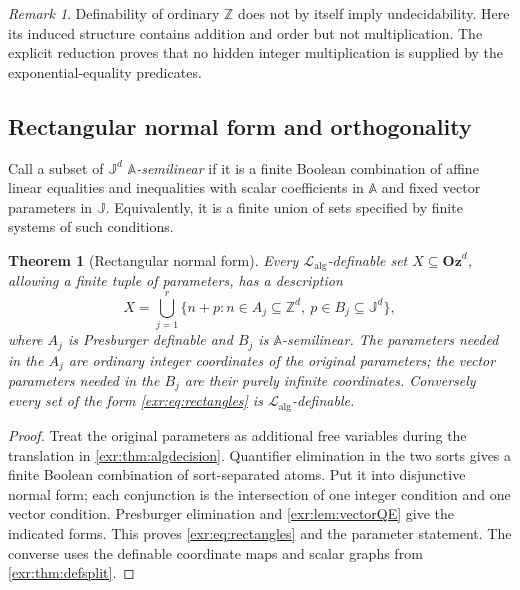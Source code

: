 \documentclass[11pt,letterpaper]{article}
\numberwithin{equation}{section}
\newtheorem{theorem}{Theorem}[section]
\theoremstyle{definition}
\theoremstyle{remark}
\newtheorem{remark}[remark]{Remark}
\newcommand{\Oz}{\mathbf{Oz}}
\newcommand{\Z}{\mathbb Z}
\newcommand{\A}{\mathbb A}
\newcommand{\J}{\mathbb J}
\newcommand{\Lalg}{\mathcal L_{\mathrm{alg}}}
\begin{document}
\begin{remark}
Definability of ordinary $\Z$ does not by itself imply undecidability. Here its
induced structure contains addition and order but not multiplication. The explicit
reduction proves that no hidden integer multiplication is supplied by the
exponential-equality predicates.
\end{remark}

\subsection{Rectangular normal form and orthogonality}
Call a subset of $\J^d$ \emph{$\A$-semilinear} if it is a finite Boolean combination
of affine linear equalities and inequalities with scalar coefficients in $\A$
and fixed vector parameters in $\J$. Equivalently, it is a finite union of sets
specified by finite systems of such conditions.

\begin{theorem}[Rectangular normal form]\label{exr:thm:rectangles}
Every $\Lalg$-definable set $X\subseteq\Oz^d$, allowing a finite tuple of parameters,
has a description
\begin{equation}\label{exr:eq:rectangles}
 X=\bigcup_{j=1}^{r}
 \{n+p:n\in A_j\subseteq\Z^d,\ p\in B_j\subseteq\J^d\},
\end{equation}
where $A_j$ is Presburger definable and $B_j$ is $\A$-semilinear. The parameters
needed in the $A_j$ are ordinary integer coordinates of the original parameters;
the vector parameters needed in the $B_j$ are their purely infinite coordinates.
Conversely every set of the form \eqref{exr:eq:rectangles} is $\Lalg$-definable.
\end{theorem}
\begin{proof}
Treat the original parameters as additional free variables during the translation
in \cref{exr:thm:algdecision}. Quantifier elimination in the two sorts gives a finite
Boolean combination of sort-separated atoms. Put it into disjunctive normal form;
each conjunction is the intersection of one integer condition and one vector
condition. Presburger elimination and \cref{exr:lem:vectorQE} give the indicated
forms. This proves \eqref{exr:eq:rectangles} and the parameter statement. The converse
uses the definable coordinate maps and scalar graphs from \cref{exr:thm:defsplit}.
\end{proof}
\end{document}
